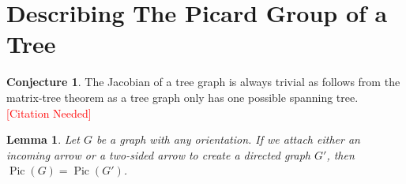 \documentclass[11pt,reqno]{amsart}
\DeclareMathOperator{\Pic}{Pic}
\theoremstyle{definition}
\newtheorem{conj}[mydef]{\textbf{Conjecture}}
\theoremstyle{plain}
\newtheorem{lem}[mydef]{\textbf{Lemma}}
\begin{document}
\section{Describing The Picard Group of a Tree}

	\begin{conj}
		The Jacobian of a tree graph is always trivial as follows from the matrix-tree theorem as a
		tree graph only has one possible spanning tree. \textcolor{red}{[Citation Needed]}
	\end{conj}

	\begin{lem}
		Let $G$ be a graph with any orientation. If we attach either an incoming arrow or a two-sided
		arrow to create a directed graph $G'$, then $\Pic(G)=\Pic(G')$. \label{proposition: gluing an arrow proposition}
	\end{lem}
\end{document}
